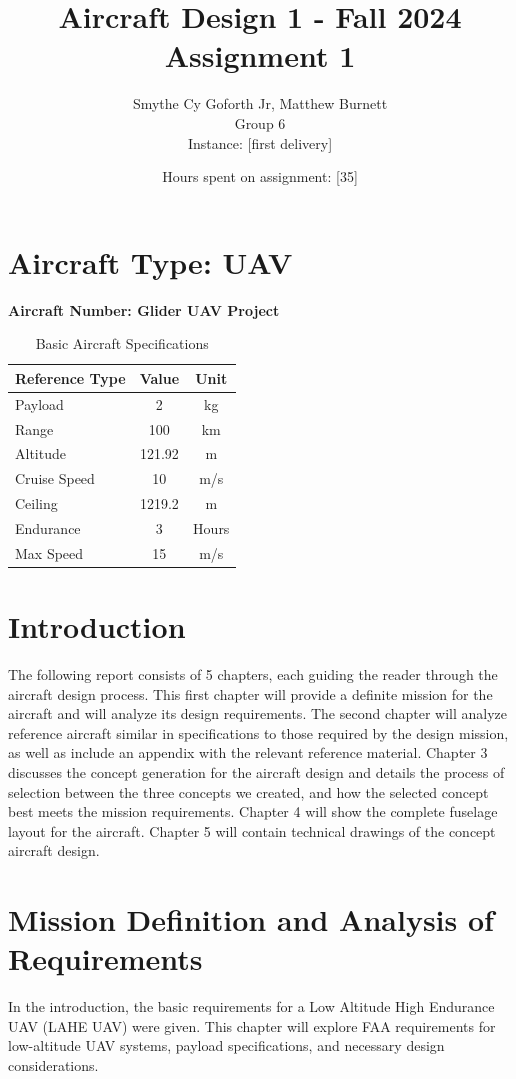 \documentclass[12pt]{article}
\title{Aircraft Design 1 - Fall 2024 \\ Assignment 1}
\author{Smythe Cy Goforth Jr, Matthew Burnett \\ Group 6 \\ Instance: [first delivery]}
\date{Hours spent on assignment: [35]}
\begin{document}
	
	\maketitle
	
	\section*{Aircraft Type: UAV}
	\textbf{Aircraft Number: Glider UAV Project}
	
	\begin{table}[h!]
		\centering
		\begin{tabular}{|l|c|c|}
			\hline
			Reference Type & Value & Unit \\
			\hline
			Payload & 2 & kg \\
			Range & 100 & km \\
			Altitude & 121.92 & m \\
			Cruise Speed & 10 & m/s \\
			Ceiling & 1219.2 & m \\
			Endurance & 3 & Hours \\
			Max Speed & 15 & m/s \\
			\hline
		\end{tabular}
		\caption{Basic Aircraft Specifications}
	\end{table}
	
	\newpage
	
	\tableofcontents
	
	\newpage
	
	\section{Introduction}
	The following report consists of 5 chapters, each guiding the reader through the aircraft design process. This first chapter will provide a definite mission for the aircraft and will analyze its design requirements. The second chapter will analyze reference aircraft similar in specifications to those required by the design mission, as well as include an appendix with the relevant reference material. Chapter 3 discusses the concept generation for the aircraft design and details the process of selection between the three concepts we created, and how the selected concept best meets the mission requirements. Chapter 4 will show the complete fuselage layout for the aircraft. Chapter 5 will contain technical drawings of the concept aircraft design.
	
	\section{Mission Definition and Analysis of Requirements}
	In the introduction, the basic requirements for a Low Altitude High Endurance UAV (LAHE UAV) were given. This chapter will explore FAA requirements for low-altitude UAV systems, payload specifications, and necessary design considerations.
	
\end{document}
